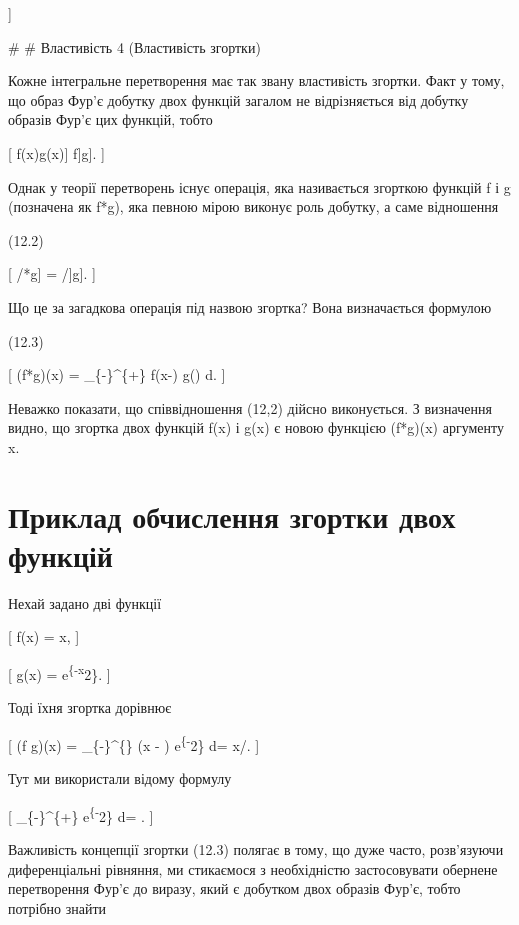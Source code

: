 \documentclass[
  ukrainian,
]{article}
\begin{document}
{]}

\# \# Властивість 4 (Властивість згортки)

Кожне інтегральне перетворення має так звану властивість згортки. Факт у
тому, що образ Фур'є добутку двох функцій загалом не відрізняється від
добутку образів Фур'є цих функцій, тобто

{[} \mathcal{F}{[}f(x)g(x){]} \neq \mathcal{F}{[}f{]}\mathcal{F}{[}g{]}.
{]}

Однак у теорії перетворень існує операція, яка називається згорткою
функцій f і g (позначена як f*g), яка певною мірою виконує роль добутку,
а саме відношення

(12.2)

{[} \mathcal{F}{[}/*g{]} = \mathcal{F}{[}/{]}\mathcal{F}{[}g{]}. {]}

Що це за загадкова операція під назвою згортка? Вона визначається
формулою

(12.3)

{[} (f*g)(x) =  \int\_\{-\infty\}\^{}\{+\infty\}
f(x-\xi) g(\xi) d\xi. {]}

Неважко показати, що співвідношення (12,2) дійсно виконується. З
визначення видно, що згортка двох функцій f(x) і g(x) є новою функцією
(f*g)(x) аргументу x.

\section{Приклад обчислення згортки двох
функцій}\label{ux43fux440ux438ux43aux43bux430ux434-ux43eux431ux447ux438ux441ux43bux435ux43dux43dux44f-ux437ux433ux43eux440ux442ux43aux438-ux434ux432ux43eux445-ux444ux443ux43dux43aux446ux456ux439}

Нехай задано дві функції

{[} f(x) = x, {]}

{[} g(x) = e\textsuperscript{\{-x}2\}. {]}

Тоді їхня згортка дорівнює

{[} (f \circ g)(x) = 
\int\_\{-\infty\}\^{}\{\infty\} (x - \xi) e\textsuperscript{\{-\xi}2\}
d\xi = x/. {]}

Тут ми використали відому формулу

{[} \int\_\{-\infty\}\^{}\{+\infty\} e\textsuperscript{\{-\xi}2\} d\xi =
\sqrt{\pi}. {]}

Важливість концепції згортки (12.3) полягає в тому, що дуже часто,
розв'язуючи диференціальні рівняння, ми стикаємося з необхідністю
застосовувати обернене перетворення Фур'є до виразу, який є добутком
двох образів Фур'є, тобто потрібно знайти
\end{document}
